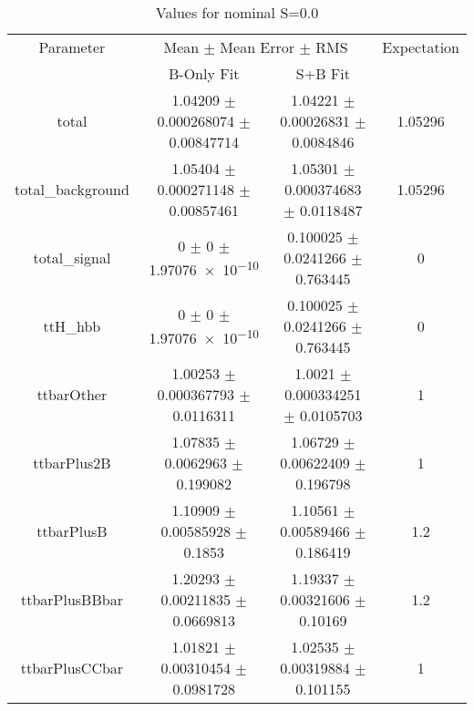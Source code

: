 \begin{table}
\centering
\caption{Values for nominal S=0.0}
\begin{tabular}{cccc}
\toprule
Parameter & \multicolumn{2}{c}{Mean $\pm$ Mean Error $\pm$ RMS} & Expectation\\
 & B-Only Fit & S+B Fit & \\
\midrule
total & \num{1.04209} $\pm$ \num{0.000268074} $\pm$ \num{0.00847714} & \num{1.04221} $\pm$ \num{0.00026831} $\pm$ \num{0.0084846} & \num{1.05296}\\
total\_background & \num{1.05404} $\pm$ \num{0.000271148} $\pm$ \num{0.00857461} & \num{1.05301} $\pm$ \num{0.000374683} $\pm$ \num{0.0118487} & \num{1.05296}\\
total\_signal & \num{0} $\pm$ \num{0} $\pm$ \num{1.97076e-10} & \num{0.100025} $\pm$ \num{0.0241266} $\pm$ \num{0.763445} & \num{0}\\
ttH\_hbb & \num{0} $\pm$ \num{0} $\pm$ \num{1.97076e-10} & \num{0.100025} $\pm$ \num{0.0241266} $\pm$ \num{0.763445} & \num{0}\\
ttbarOther & \num{1.00253} $\pm$ \num{0.000367793} $\pm$ \num{0.0116311} & \num{1.0021} $\pm$ \num{0.000334251} $\pm$ \num{0.0105703} & \num{1}\\
ttbarPlus2B & \num{1.07835} $\pm$ \num{0.0062963} $\pm$ \num{0.199082} & \num{1.06729} $\pm$ \num{0.00622409} $\pm$ \num{0.196798} & \num{1}\\
ttbarPlusB & \num{1.10909} $\pm$ \num{0.00585928} $\pm$ \num{0.1853} & \num{1.10561} $\pm$ \num{0.00589466} $\pm$ \num{0.186419} & \num{1.2}\\
ttbarPlusBBbar & \num{1.20293} $\pm$ \num{0.00211835} $\pm$ \num{0.0669813} & \num{1.19337} $\pm$ \num{0.00321606} $\pm$ \num{0.10169} & \num{1.2}\\
ttbarPlusCCbar & \num{1.01821} $\pm$ \num{0.00310454} $\pm$ \num{0.0981728} & \num{1.02535} $\pm$ \num{0.00319884} $\pm$ \num{0.101155} & \num{1}\\
\bottomrule
\end{tabular}
\end{table}